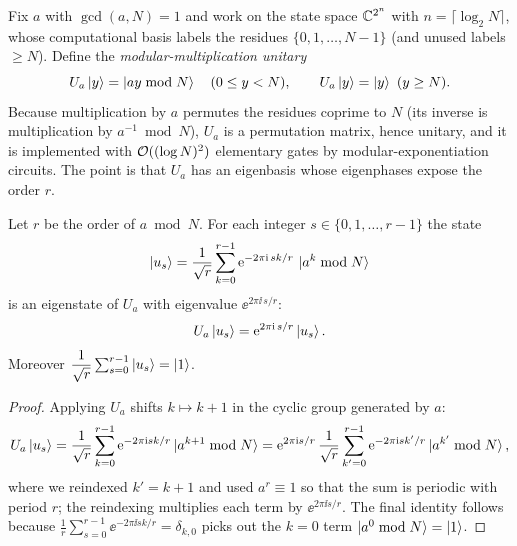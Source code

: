 Fix $a$ with $\gcd(a,N)=1$ and work on the state space $\mathbb{C}^{2^n}$ with
$n=\lceil\log_2 N\rceil$, whose computational basis labels the residues
$\{0,1,\dots,N-1\}$ (and unused labels $\ge N$). Define the
\emph{modular-multiplication unitary}
\begin{equation}
  U_a\ket{y}=\ket{ay\bmod N}\quad(0\le y<N),
  \qquad U_a\ket{y}=\ket{y}\ (y\ge N).
  \label{eq:lec05-Ua}
\end{equation}
Because multiplication by $a$ permutes the residues coprime to $N$ (its inverse is
multiplication by $a^{-1}\bmod N$), $U_a$ is a permutation matrix, hence unitary,
and it is implemented with $\mathcal{O}((\log N)^2)$ elementary gates by
modular-exponentiation circuits. The point is that $U_a$ has an eigenbasis whose
eigenphases expose the order $r$.

\begin{lemma}
\label{lem:lec05-Ua}
Let $r$ be the order of $a\bmod N$. For each integer $s\in\{0,1,\dots,r-1\}$ the
state
\[
  \ket{u_s}=\frac{1}{\sqrt r}\sum_{k=0}^{r-1}
             \mathrm{e}^{-2\pi\mathrm{i}\, sk/r}\,\ket{a^{k}\bmod N}
\]
is an eigenstate of $U_a$ with eigenvalue $\ee^{2\pi\ii\, s/r}$:
\[
  U_a\ket{u_s}=\mathrm{e}^{2\pi\mathrm{i}\, s/r}\ket{u_s}.
\]
Moreover $\dfrac{1}{\sqrt r}\sum_{s=0}^{r-1}\ket{u_s}=\ket{1}$.
\end{lemma}

\begin{proof}
Applying $U_a$ shifts $k\mapsto k+1$ in the cyclic group generated by $a$:
\[
  U_a\ket{u_s}=\frac{1}{\sqrt r}\sum_{k=0}^{r-1}
    \mathrm{e}^{-2\pi\mathrm{i} sk/r}\ket{a^{k+1}\bmod N}
   =\mathrm{e}^{2\pi\mathrm{i} s/r}\,\frac{1}{\sqrt r}\sum_{k'=0}^{r-1}
    \mathrm{e}^{-2\pi\mathrm{i} sk'/r}\ket{a^{k'}\bmod N},
\]
where we reindexed $k'=k+1$ and used $a^{r}\equiv1$ so that the sum is periodic
with period $r$; the reindexing multiplies each term by $\ee^{2\pi\ii s/r}$. The
final identity follows because
$\frac1r\sum_{s=0}^{r-1}\ee^{-2\pi\ii sk/r}=\delta_{k,0}$ picks out the $k=0$ term
$\ket{a^0\bmod N}=\ket{1}$.
\end{proof}

